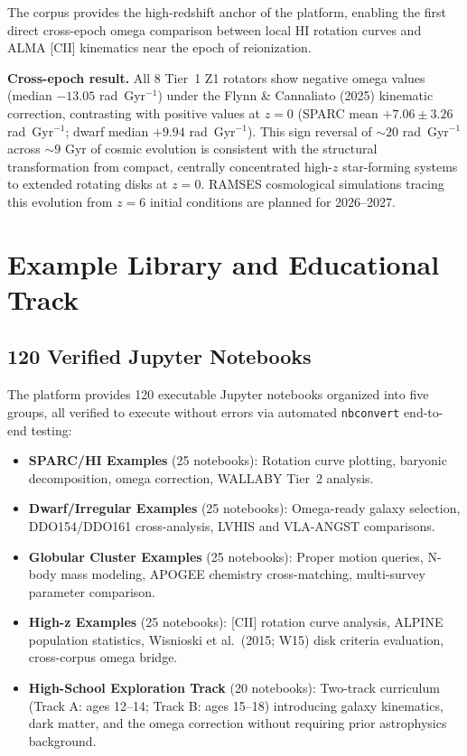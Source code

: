 \documentclass[twocolumn]{aastex631}
\begin{document}
The corpus provides the high-redshift anchor of the platform, enabling the
first direct cross-epoch omega comparison between local HI rotation curves
and ALMA [CII] kinematics near the epoch of reionization.

\textbf{Cross-epoch result.} All 8 Tier~1 Z1 rotators show negative omega
values (median $-13.05$ rad~Gyr$^{-1}$) under the Flynn \& Cannaliato (2025)
kinematic correction, contrasting with positive values at $z = 0$ (SPARC mean
$+7.06 \pm 3.26$ rad~Gyr$^{-1}$; dwarf median $+9.94$ rad~Gyr$^{-1}$). This
sign reversal of $\sim 20$ rad~Gyr$^{-1}$ across $\sim 9$ Gyr of cosmic
evolution is consistent with the structural transformation from compact,
centrally concentrated high-$z$ star-forming systems to extended rotating
disks at $z = 0$. RAMSES cosmological simulations tracing this evolution from
$z = 6$ initial conditions are planned for 2026--2027.

\section{Example Library and Educational Track}
\label{sec:examples}

\subsection{120 Verified Jupyter Notebooks}
\label{sec:notebooks}

The platform provides 120 executable Jupyter notebooks organized into five
groups, all verified to execute without errors via automated \texttt{nbconvert}
end-to-end testing:

\begin{itemize}
\item \textbf{SPARC/HI Examples} (25 notebooks): Rotation curve plotting,
      baryonic decomposition, omega correction, WALLABY Tier~2 analysis.
\item \textbf{Dwarf/Irregular Examples} (25 notebooks): Omega-ready galaxy
      selection, DDO154/DDO161 cross-analysis, LVHIS and VLA-ANGST comparisons.
\item \textbf{Globular Cluster Examples} (25 notebooks): Proper motion queries,
      N-body mass modeling, APOGEE chemistry cross-matching, multi-survey
      parameter comparison.
\item \textbf{High-z Examples} (25 notebooks): [CII] rotation curve analysis,
      ALPINE population statistics, Wisnioski et al.\ (2015; W15) disk criteria evaluation, cross-corpus
      omega bridge.
\item \textbf{High-School Exploration Track} (20 notebooks): Two-track
      curriculum (Track A: ages 12--14; Track B: ages 15--18) introducing
      galaxy kinematics, dark matter, and the omega correction without
      requiring prior astrophysics background.
\end{itemize}
\end{document}
